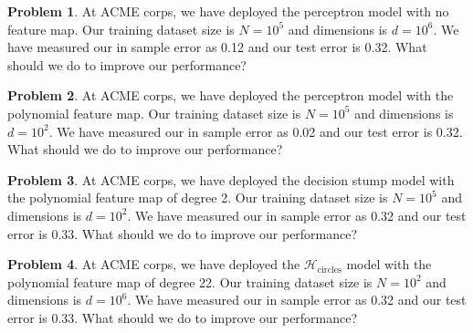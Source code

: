 \documentclass[10pt]{exam}
\theoremstyle{definition}
\newtheorem{problem}{Problem}
\newcommand{\HH}[1]{\mathcal H_{\text{#1}}}
\begin{document}
\newpage
\begin{problem}
At ACME corps, we have deployed the perceptron model with no feature map.
Our training dataset size is $N=10^5$ and dimensions is $d=10^6$.
We have measured our in sample error as 0.12 and our test error is 0.32.
What should we do to improve our performance?
\end{problem}

\begin{problem}
At ACME corps, we have deployed the perceptron model with the polynomial feature map.
Our training dataset size is $N=10^5$ and dimensions is $d=10^2$.
We have measured our in sample error as 0.02 and our test error is 0.32.
What should we do to improve our performance?
\end{problem}

\begin{problem}
At ACME corps, we have deployed the decision stump model with the polynomial feature map of degree 2.
Our training dataset size is $N=10^5$ and dimensions is $d=10^2$.
We have measured our in sample error as 0.32 and our test error is 0.33.
What should we do to improve our performance?
\end{problem}

\begin{problem}
At ACME corps, we have deployed the $\HH{circles}$ model with the polynomial feature map of degree 22.
Our training dataset size is $N=10^2$ and dimensions is $d=10^6$.
We have measured our in sample error as 0.32 and our test error is 0.33.
What should we do to improve our performance?
\end{problem}
\end{document}
